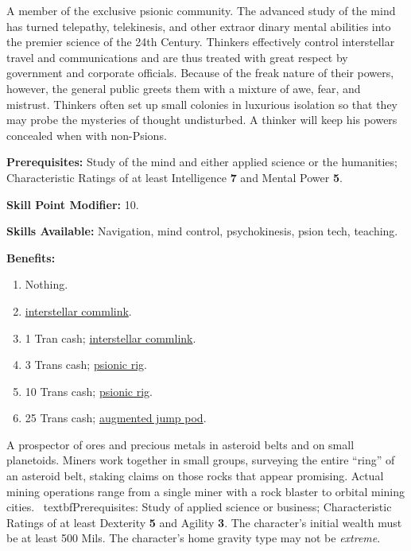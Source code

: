  \label{sec:prof-thinker}

A member of the exclusive psionic community.
The advanced study of the mind has turned telepathy, telekinesis, and
other extraor dinary mental abilities into the premier science of the
24th Century. Thinkers effectively control interstellar travel and
communications and are thus treated with great respect by government
and corporate officials. Because of the freak nature of their powers,
however, the general public greets them with a mixture of awe, fear,
and mistrust. Thinkers often set up small colonies in luxurious
isolation so that they may probe the mysteries of thought undisturbed.
A thinker will keep his powers concealed when with non-Psions.

\textbf{Prerequisites:} Study of the mind and either applied science
or the humanities; Characteristic Ratings of at least Intelligence
\textbf{7} and Mental Power \textbf{5}.

\textbf{Skill Point Modifier:} 10.

\textbf{Skills Available:}  Navigation, mind control, psychokinesis,
  psion tech, teaching.

\pagebreak[2]
\textbf{Benefits:}
\begin{enumerate}
\item Nothing. 
\item \hyperlink{tag:commlink}{interstellar commlink}.  
\item 1 Tran cash; \hyperlink{tag:commlink}{interstellar commlink}.  
\item 3 Trans cash; \hyperlink{tag:psionic-rig}{psionic rig}.
\item 10 Trans cash; \hyperlink{tag:psionic-rig}{psionic rig}.  
\item 25 Trans cash; \hyperlink{tag:augmented-jump}{augmented  jump pod}. 
\end{enumerate}

\bigskip

\pagebreak[2]

\label{sec:prof-zero-g-miner}
  
A prospector of ores and precious metals in asteroid belts and on
small planetoids. Miners work together in small groups, surveying the
entire ``ring'' of an asteroid belt, staking claims on those rocks
that appear promising. Actual mining operations range from a single
miner with a rock blaster to orbital mining cities.
\
textbf{Prerequisites:} Study of applied science or business;
Characteristic Ratings of at least Dexterity \textbf{5} and Agility
\textbf{3}. The character's initial wealth must be at least 500 Mils.
The character's home gravity type may not be \emph{extreme}.

